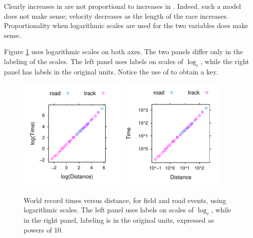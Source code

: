 Clearly increases in  are not proportional to increases in
.  Indeed, such a model does not make sense; velocity
decreases as the length of the race increases.  Proportionality when
logarithmic scales are used for the two variables does make sense.

Figure \ref{fig:wrlog} uses logarithmic scales on both axes.  The two
panels differ only in the labeling of the scales.  The left panel uses
labels on scales of $\log_e$, while the right panel has labels in the
original units.  Notice the use of
 to obtain a key.

\begin{figure}
\begin{Schunk}


\centerline{\includegraphics[width=0.47\textwidth]{figs/03-wrTimesAB-1} \includegraphics[width=0.47\textwidth]{figs/03-wrTimesAB-2} }

\end{Schunk}
\caption{World record times versus distance, for field and road
  events, using logarithmic scales.  The left panel uses labels on
  scales of $\log_e$, while in the right panel, labeling is in the
  original units, expressed as powers of 10.}
\label{fig:wrlog}
\end{figure}

